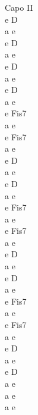 \begin{chord}
Capo II\\
e D\\
a e\\
e D\\
a e\\

e D\\
a e\\
e D\\
a e\\

e Fis7\\
a e\\
e Fis7\\
a e\\

e D\\
a e\\
e D\\
a e\\

e Fis7\\
a e\\
e Fis7\\
a e\\

e D\\
a e\\
e D\\
a e\\

e Fis7\\
a e\\
e Fis7\\
a e\\

e D\\
a e\\
e D\\
a e\\
a e\\
a e\\
\end{chord}